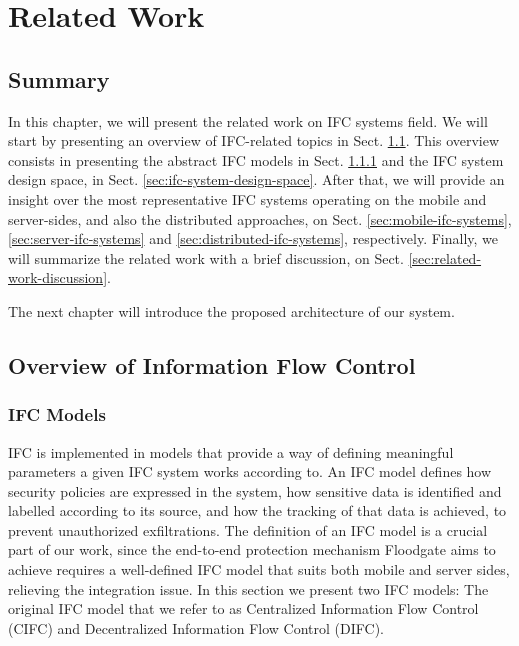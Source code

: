 \chapter{Related Work}
\label{sec:RelatedWork}
 
\section*{Summary}

In this chapter, we will present the related work on IFC systems field. We will start by presenting an overview of IFC-related topics in Sect. \ref{sec:overview-ifc}. This overview consists in presenting the abstract IFC models in Sect. \ref{sec:ifc-models} and the IFC system design space, in Sect. \ref{sec:ifc-system-design-space}. After that, we will provide an insight over the most representative IFC systems operating on the mobile and server-sides, and also the distributed approaches, on Sect. \ref{sec:mobile-ifc-systems}, \ref{sec:server-ifc-systems} and \ref{sec:distributed-ifc-systems}, respectively. Finally, we will  summarize the related work with a brief discussion, on Sect. \ref{sec:related-work-discussion}.

The next chapter will introduce the proposed architecture of our system.

\section{Overview of Information Flow Control}
\label{sec:overview-ifc}


\subsection{IFC Models}
\label{sec:ifc-models}

IFC is implemented in models that provide a way of defining meaningful parameters a given IFC system works according to. An IFC model defines how security policies are expressed in the system, how sensitive data is identified and labelled according to its source, and how the tracking of that data is achieved, to prevent unauthorized exfiltrations. The definition of an IFC model is a crucial part of our work, since the end-to-end protection mechanism Floodgate aims to achieve requires a well-defined IFC model that suits both mobile and server sides, relieving the integration issue. In this section we present two IFC models: The original IFC model that we refer to as Centralized Information Flow Control (CIFC) and Decentralized Information Flow Control (DIFC).

